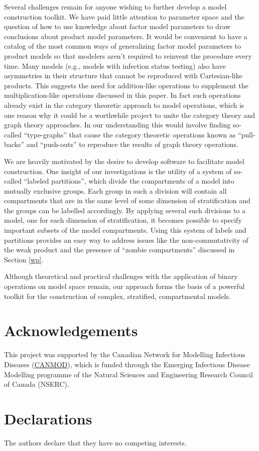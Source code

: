 \documentclass[referee,sn-basic]{sn-jnl}%
\theoremstyle{definition}
\begin{document}
Several challenges remain for anyone wishing to further develop a model construction toolkit. We have paid little attention to parameter space and the question of how to use knowledge about factor model parameters to draw conclusions about product model parameters. It would be convenient to have a catalog of the most common ways of generalizing factor model parameters to product models so that modelers aren't required to reinvent the procedure every time. Many models (e.g., models with infection status testing) also have asymmetries in their structure that cannot be reproduced with Cartesian-like products. This suggests the need for addition-like operations to supplement the multiplication-like operations discussed in this paper. In fact such operations already exist in the category theoretic approach to model operations, which is one reason why it could be a worthwhile project to unite the category theory and graph theory approaches. In our understanding this would involve finding so-called ``type-graphs'' that cause the category theoretic operations known as ``pull-backs'' and ``push-outs'' to  reproduce the results of graph theory operations.
\citep{fong2018seven, Libkind2022an, libkind2021operadic, baez2022compositional, baez2017compositional}

We are heavily motivated by the desire to develop software to facilitate model construction. One insight of our investigations is the utility of a system of so-called ``labeled partitions'', which divide the compartments of a model into mutually exclusive groups. Each group in such a division will contain all compartments that are in the same level of some dimension of stratification and the groups can be labelled accordingly. By applying several such divisions to a model, one for each dimension of stratification, it becomes possible to specify important subsets of the model compartments. Using this system of labels and partitions provides an easy way to address issues like the non-commutativity of the weak product and the presence of ``zombie compartments'' discussed in Section \ref{wp}.

Although theoretical and practical challenges with the application of binary operations on model space remain, our approach forms the basis of a powerful toolkit for the construction of complex, stratified, compartmental models.

\section{Acknowledgements}

This project was supported by the Canadian Network for Modelling Infectious Diseases (\href{https://canmod.net/}{CANMOD}), which is funded through the Emerging Infectious Disease Modelling programme of the Natural Sciences and Engineering Research Council of Canada (NSERC).

\section{Declarations}

The authors declare that they have no competing interests.


\end{document}
